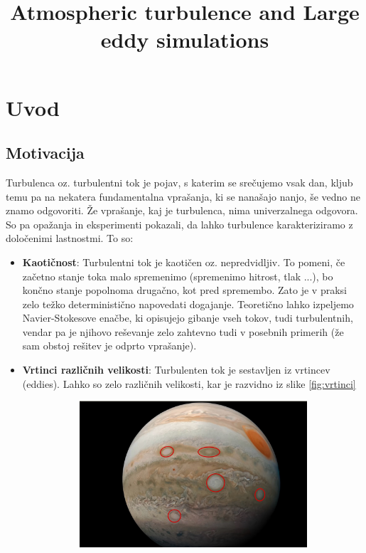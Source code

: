 \documentclass[mat2, tisk]{fmfdelo}
\title{Atmospheric turbulence and Large eddy simulations}
\begin{document}
\section{Uvod}

\subsection{Motivacija}
Turbulenca oz. turbulentni tok je pojav, s katerim se srečujemo vsak dan, kljub temu pa na nekatera fundamentalna
vprašanja, ki se nanašajo nanjo, še vedno ne znamo odgovoriti. Že vprašanje, kaj je turbulenca, nima
univerzalnega odgovora. So pa opažanja in eksperimenti pokazali, da lahko turbulence
karakteriziramo z določenimi lastnostmi. To so:
\begin{itemize}
\item \textbf{Kaotičnost}: Turbulentni tok je kaotičen oz. nepredvidljiv. To pomeni, če
začetno stanje toka malo spremenimo (spremenimo hitrost, tlak ...), bo končno stanje popolnoma
drugačno, kot pred spremembo. Zato je v praksi zelo težko deterministično napovedati dogajanje.
Teoretično lahko izpeljemo Navier-Stokesove enačbe, ki opisujejo gibanje vseh tokov, tudi turbulentnih,
vendar pa je njihovo reševanje zelo zahtevno tudi v posebnih primerih (že sam obstoj rešitev je 
odprto vprašanje).
\item \textbf{Vrtinci različnih velikosti}: Turbulenten tok je sestavljen iz vrtincev (eddies). Lahko so zelo
različnih velikosti, kar je razvidno iz slike \ref{fig:vrtinci}
\begin{figure}[h!]
  \centering
  \begin{subfigure}{.5\textwidth}
    \centering
    \includegraphics[width=0.95\linewidth]{slike/vrtinci.jpeg}

\end{subfigure}
\end{figure}
\end{itemize}
\end{document}
